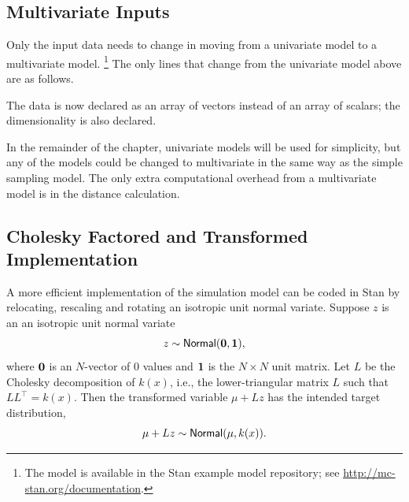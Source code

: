 \subsection{Multivariate Inputs}

Only the input data needs to change in moving from a univariate model to a
multivariate model.%
%
\footnote{The model is available in the Stan example model repository;
see \url{http://mc-stan.org/documentation}.}
%
The only lines that change from the univariate model above are as follows.
%
\begin{stancode}
data {
  int<lower=1> D;
  int<lower=1> N;
  vector[D] x[N];
}
transformed data {
...
...
\end{stancode}
%
The data is now declared as an array of vectors instead of an array of
scalars; the dimensionality  is also declared.  

In the remainder of the chapter, univariate models will be used for simplicity,
but any of the models could be changed to multivariate in the same way as the
simple sampling model. The only extra computational overhead from a
multivariate model is in the distance calculation.

\subsection{Cholesky Factored and Transformed Implementation}

A more efficient implementation of the simulation model can be
coded in Stan by relocating, rescaling and rotating an isotropic unit
normal variate.  Suppose $z$ is an an isotropic unit normal variate
\[
z \sim \distro{Normal}({\bf 0}, {\bf 1}),
\]
where ${\bf 0}$ is an $N$-vector of 0 values and ${\bf 1}$ is the $N
\times N$ unit matrix.  Let $L$ be the Cholesky decomposition of
$k(x)$, i.e., the lower-triangular matrix $L$ such that $LL^{\top} =
k(x)$.  Then the transformed variable $\mu + Lz$ has the intended
target distribution,
\[
\mu + Lz \sim \distro{Normal}(\mu, k(x)).
\]

